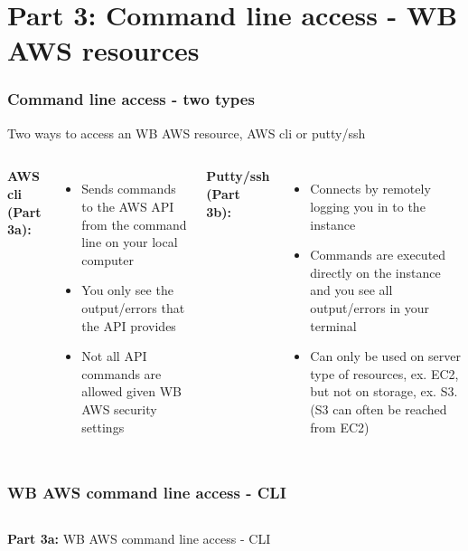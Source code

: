 \documentclass[aspectratio=169]{beamer} %
\begin{document}
\section{Part 3: Command line access - WB AWS resources}

\begin{frame}
	\frametitle{Command line access - two types}

	Two ways to access an WB AWS resource, AWS cli or putty/ssh

	\vspace{.5cm}

	\begin{columns}[t]
		
		\textbf{AWS cli (Part 3a):}
		\begin{itemize}
			\item Sends commands to the AWS API from the command line on your local computer
			\item You only see the output/errors that the API provides
			\item Not all API commands are allowed given WB AWS security settings
		\end{itemize}
	
		\textbf{Putty/ssh (Part 3b):}
		\begin{itemize}
			\item Connects by remotely logging you in to the instance
			\item Commands are executed directly on the instance and you see all output/errors in your terminal
			\item Can only be used on server type of resources, ex. EC2, but not on storage, ex. S3. (S3 can often be reached from EC2) 
		\end{itemize}
		
	\end{columns}
\end{frame}

\begin{frame}
	\frametitle{WB AWS command line access - CLI}
	\begin{columns}[c]
		
		
		\textbf{Part 3a:} WB AWS command line access - CLI
		
	\end{columns}
\end{frame}
\end{document}
